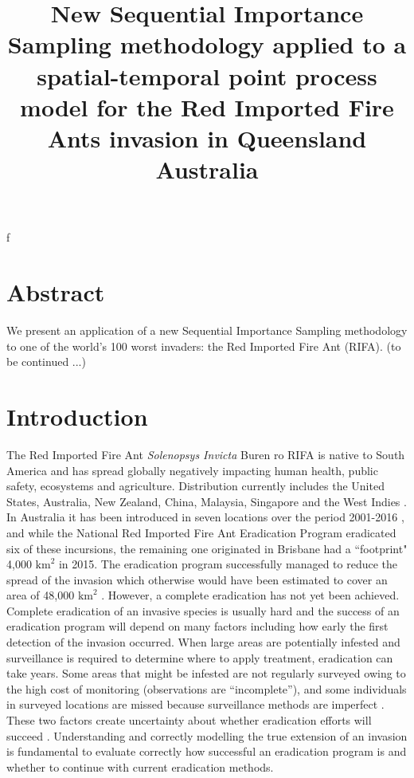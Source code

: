 \documentclass[11pt,a4paper]{article}
\title{New Sequential Importance Sampling methodology applied to a spatial-temporal point process model for the Red Imported Fire Ants invasion in Queensland Australia}
\begin{document}
\maketitle
f{\color{red}
\section{Abstract}\label{section:abstract}
We present an application of a new Sequential Importance Sampling methodology to one of the world's 100 worst invaders: the Red Imported Fire Ant (RIFA). (to be continued ...)}

{\color{red}
\section{Introduction}\label{section:introduction}
The Red Imported Fire Ant \textit{Solenopsys Invicta} Buren \cite{GISD} ro RIFA is native to South America and has spread globally \cite{Wetterer} negatively impacting human health, public safety, ecosystems and agriculture. Distribution currently includes the United States, Australia, New Zealand, China, Malaysia, Singapore and the West Indies \cite{Wang} \cite{GISD}. In Australia it has been introduced in seven locations over the period 2001-2016 \cite{WylieMay16}, and while the National Red Imported Fire Ant Eradication Program eradicated six of these incursions, the remaining one originated in Brisbane had a ``footprint" 4,000 $\text{km}^2$ in 2015. The eradication program successfully managed to reduce the spread of the invasion which otherwise would have been estimated to cover an area of 48,000 $\text{km}^2$ \cite{Wylie2020}. However, a complete eradication has not yet been achieved. Complete eradication of an invasive species is usually hard and the success of an eradication program will depend on many factors including how early the first detection of the invasion occurred. When large areas are potentially infested and surveillance is required to determine where to apply treatment, eradication can take years. Some areas that might be infested are not regularly surveyed owing to the high cost of monitoring (observations are “incomplete”), and some individuals in surveyed locations are missed because surveillance methods are imperfect \cite{Royle}. These two factors create uncertainty about whether eradication efforts will succeed  \cite{Keith}. Understanding and correctly modelling the true extension of an invasion is fundamental to evaluate correctly how successful an eradication program is and whether to continue with current eradication methods. 

}
\end{document}
